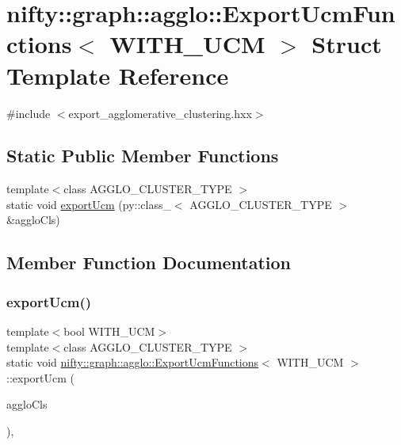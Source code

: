 \hypertarget{structnifty_1_1graph_1_1agglo_1_1ExportUcmFunctions}{}\section{nifty\+:\+:graph\+:\+:agglo\+:\+:Export\+Ucm\+Functions$<$ W\+I\+T\+H\+\_\+\+U\+CM $>$ Struct Template Reference}
\label{structnifty_1_1graph_1_1agglo_1_1ExportUcmFunctions}


{\ttfamily \#include $<$export\+\_\+agglomerative\+\_\+clustering.\+hxx$>$}

\subsection*{Static Public Member Functions}
\begin{DoxyCompactItemize}
\item 
{\footnotesize template$<$class A\+G\+G\+L\+O\+\_\+\+C\+L\+U\+S\+T\+E\+R\+\_\+\+T\+Y\+PE $>$ }\\static void \hyperlink{structnifty_1_1graph_1_1agglo_1_1ExportUcmFunctions_a28f42debbf388f49df82b738783b7490}{export\+Ucm} (py\+::class\+\_\+$<$ A\+G\+G\+L\+O\+\_\+\+C\+L\+U\+S\+T\+E\+R\+\_\+\+T\+Y\+PE $>$ \&agglo\+Cls)
\end{DoxyCompactItemize}


\subsection{Member Function Documentation}
\mbox{\label{structnifty_1_1graph_1_1agglo_1_1ExportUcmFunctions_a28f42debbf388f49df82b738783b7490}} 
\subsubsection{\texorpdfstring{export\+Ucm()}{exportUcm()}}
{\footnotesize\ttfamily template$<$bool W\+I\+T\+H\+\_\+\+U\+CM$>$ \\
template$<$class A\+G\+G\+L\+O\+\_\+\+C\+L\+U\+S\+T\+E\+R\+\_\+\+T\+Y\+PE $>$ \\
static void \hyperlink{structnifty_1_1graph_1_1agglo_1_1ExportUcmFunctions}{nifty\+::graph\+::agglo\+::\+Export\+Ucm\+Functions}$<$ W\+I\+T\+H\+\_\+\+U\+CM $>$\+::export\+Ucm (\begin{DoxyParamCaption}\item[{py\+::class\+\_\+$<$ A\+G\+G\+L\+O\+\_\+\+C\+L\+U\+S\+T\+E\+R\+\_\+\+T\+Y\+PE $>$ \&}]{agglo\+Cls }\end{DoxyParamCaption})\hspace{0.3cm}{\ttfamily [inline]}, {\ttfamily [static]}}



